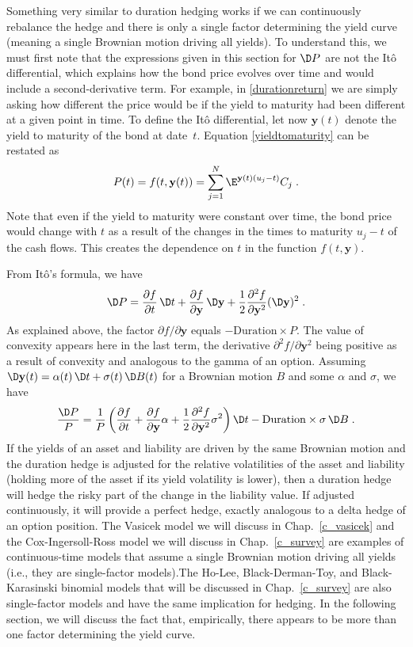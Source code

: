 Something very similar to duration hedging works if we can continuously rebalance the hedge and there is only a single factor determining the yield curve (meaning a single Brownian motion driving all yields).  To understand this, we must first note that  the expressions given in this section for $\D P$ are not the It\^o differential, which explains how the bond price evolves over time and would include a second-derivative term.  For example, in \eqref{durationreturn} we are simply asking how different the price would be if the yield to maturity had been different at a given point in time.  To define the It\^o differential, let now $\mathbf{y}(t)$ denote the yield to maturity of the bond at date~$t$.   Equation \eqref{yieldtomaturity} can be restated as
\begin{equation}\label{yieldtomaturityt}
P(t) = f(t,\mathbf{y}(t)) = \sum_{j=1}^N \E^{\mathbf{y}(t)(u_j-t)}C_j\;.
\end{equation}
Note that even if the yield to maturity were constant over time, the bond price would change with $t$ as a result of the changes in the times to maturity $u_j-t$ of the cash flows.  This creates the dependence on $t$ in the function $f(t,\mathbf{y})$.

From It\^o's formula, we have
$$\D P = \frac{\partial f}{\partial t} \, \D t + \frac{\partial f}{\partial \mathbf{y}} \,\D \mathbf{y} + \frac{1}{2} \frac{\partial ^2 f}{\partial \mathbf{y}^2} (\D \mathbf{y})^2\; .$$  
As explained above, the factor $\partial f/\partial \mathbf{y}$ equals $ -  \text{Duration} \times P$.  The value of convexity appears here in the last term, the derivative $\partial ^2 f/\partial \mathbf{y}^2$ being positive as a result of convexity and analogous to the gamma of an option.
Assuming $\D \mathbf{y}(t) = \alpha(t)\,\D t+\sigma(t)\,\D B(t)$ for a Brownian motion $B$ and some $\alpha$ and $\sigma$, we have
$$\frac{\D P}{P} = \frac{1}{P}\left(\frac{\partial f}{\partial t}  + \frac{\partial f}{\partial \mathbf{y}}\alpha + \frac{1}{2} \frac{\partial ^2 f}{\partial \mathbf{y}^2} \sigma^2\right)\D t-  \text{Duration}\times\sigma \,\D B\; .$$
 If the yields of an asset and liability are driven by the same Brownian motion and the duration hedge is adjusted for the relative volatilities of the asset and liability (holding more of the asset if its yield volatility is lower), then a duration hedge will hedge the risky part of the change in the liability value.  If adjusted continuously, it will provide a perfect hedge, exactly analogous to a delta hedge of an option position.  The Vasicek model we will discuss in Chap.~\ref{c_vasicek} and the Cox-Ingersoll-Ross model we will discuss in Chap.~\ref{c_survey} are examples of continuous-time models that assume a single Brownian motion driving all yields (i.e., they are single-factor models).The Ho-Lee, Black-Derman-Toy, and Black-Karasinski binomial models that will be discussed in Chap.~\ref{c_survey} are also single-factor models and have the same implication for hedging.  In the following section, we will discuss the fact that, empirically, there appears to be more than one factor determining the yield curve.
 
